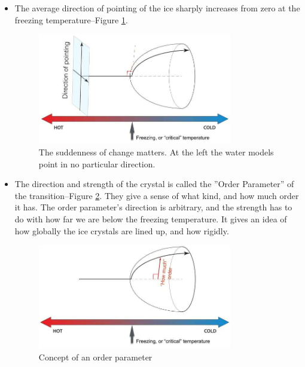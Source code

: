 \documentclass[]{article}
\begin{document}
\begin{itemize}
	\item The average direction of pointing of the ice sharply increases from zero at the freezing temperature--Figure \ref{fig:water-ice1}.
	\begin{figure}[H]
		\begin{center}
			\caption[The suddenness of change matters]{The suddenness of change matters. At the left the water models point in no particular direction.}\label{fig:water-ice1}
			\includegraphics[width=0.8\textwidth]{phase-transition1}
		\end{center}
	\end{figure}
	\item The direction and strength of the crystal is called the ''Order Parameter'' of the transition--Figure \ref{fig:water-ice2}. They give a sense of what kind, and how much order it has. The order parameter's direction is arbitrary, and the strength has to do with how far we are below the freezing temperature. It gives an idea of how globally the ice crystals are lined up, and how rigidly.
	\begin{figure}[H]
		\begin{center}
			\caption{Concept of an order parameter}\label{fig:water-ice2}
			\includegraphics[width=0.8\textwidth]{water-ice2}
		\end{center}
	\end{figure}



\end{itemize}
\end{document}
